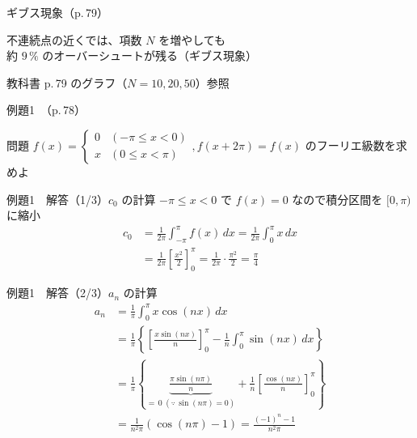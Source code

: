 \documentclass[professionalfonts]{beamer}
\begin{document}
\begin{frame}{ギブス現象（p.\,79）}
  \begin{block}{}
  不連続点の近くでは、項数 $N$ を増やしても\\
  約 $9\,\%$ のオーバーシュートが残る（ギブス現象）
  \end{block}
  \vfill
  {\small 教科書 p.\,79 のグラフ（$N = 10, 20, 50$）参照}
\end{frame}

\begin{frame}{例題1　（p.\,78）}
  \begin{exampleblock}{問題}
    $f(x) = \begin{cases} 0 & (-\pi \leq x < 0) \\ x & (0 \leq x < \pi) \end{cases}, f(x+2\pi) = f(x)$ のフーリエ級数を求めよ\\[2pt]
  \end{exampleblock}
\end{frame}

\begin{frame}{例題1　解答（1/3）$c_{0}$ の計算}
  $-\pi \leq x < 0$ で $f(x) = 0$ なので積分区間を $[0,\pi)$ に縮小\\[6pt]
  \begin{align*}
    c_{0} &= \frac{1}{2\pi}\int_{-\pi}^{\pi} f(x)\,dx
     = \frac{1}{2\pi}\int_{0}^{\pi} x\,dx \\[4pt]
     &= \frac{1}{2\pi}\left[\frac{x^{2}}{2}\right]_{0}^{\pi}
     = \frac{1}{2\pi}\cdot\frac{\pi^{2}}{2}
     = \frac{\pi}{4}
  \end{align*}
\end{frame}

\begin{frame}{例題1　解答（2/3）$a_{n}$ の計算}
  \begin{align*}
    a_{n} &= \frac{1}{\pi}\int_{0}^{\pi} x\cos(nx)\,dx \\[4pt]
    &= \frac{1}{\pi}\left\{\left[\frac{x\sin(nx)}{n}\right]_{0}^{\pi} - \frac{1}{n}\int_{0}^{\pi}\sin(nx)\,dx\right\} \\[4pt]
    &= \frac{1}{\pi}\left\{\underbrace{\frac{\pi\sin(n\pi)}{n}}_{=\,0\;(\because\,\sin(n\pi)=0)} + \frac{1}{n}\left[\frac{\cos(nx)}{n}\right]_{0}^{\pi}\right\} \\[4pt]
    &= \frac{1}{n^{2}\pi}(\cos(n\pi) - 1)
     = \frac{(-1)^{n} - 1}{n^{2}\pi}
  \end{align*}
\end{frame}
\end{document}
